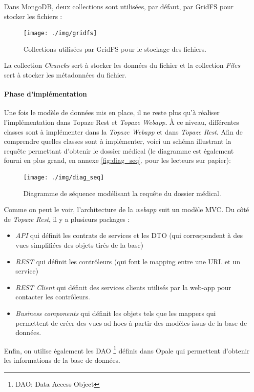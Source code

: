 Dans MongoDB, deux collections sont utilisées, par défaut, par GridFS pour stocker les fichiers :  
\begin{figure}[H]
  \centering
  \texttt{[image: ./img/gridfs]}
  \caption{\label{fig:mb_va_ast} Collections utilisées par GridFS pour le stockage des fichiers.}
\end{figure}
La collection \textit{Chuncks} sert à stocker les données du fichier et la collection \textit{Files} sert à stocker les métadonnées du fichier.

\paragraph{Phase d'implémentation\\}
Une fois le modèle de données mis en place, il ne reste plus qu'à réaliser l'implémentation dans Topaze Rest et \textit{Topaze Webapp}. 
À ce niveau, différentes classes sont à implémenter dans la \textit{Topaze Webapp} et dans \textit{Topaze Rest}. Afin de comprendre quelles classes sont à implémenter, voici un schéma illustrant la requête permettant d'obtenir le dossier médical (le diagramme est également fourni en plus grand, en annexe \ref{fig:diag_seq}, pour les lecteurs sur papier):
\begin{figure}[H]
  \centering
  \texttt{[image: ./img/diag\_seq]}
  \caption{\label{fig:mb_va_ast} Diagramme de séquence modélisant la requête du dossier médical.}
\end{figure}

Comme on peut le voir, l'architecture de la \textit{webapp} suit un modèle MVC. Du côté de \textit{Topaze Rest}, il y a plusieurs packages : 
\begin{itemize} 
\item \textit{API} qui définit les contrats de services et les \gls{DTO} (qui correspondent à des vues simplifiées des objets tirés de la base)
\item \textit{REST} qui définit les contrôleurs (qui font le mapping entre une URL et un service)
\item \textit{REST Client} qui définit des services clients utilisés par la web-app pour contacter les contrôleurs.
\item \textit{Business components} qui définit les objets tels que les mappers qui permettent de créer des vues ad-hocs à partir des modèles issus de la base de données.
\end{itemize}

Enfin, on utilise également les DAO \footnote{DAO: Data Access Object} définis dans Opale qui permettent d'obtenir les informations de la base de données.\\

